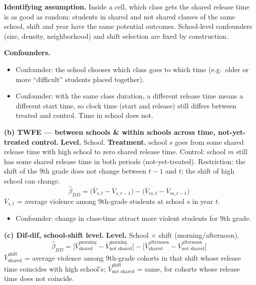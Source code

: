 \noindent\textbf{Identifying assumption.} Inside a cell, which class gets
the shared release time is as good as random: students in shared and not
shared classes of the same school, shift and year have the same potential
outcomes. School-level confounders (size, density, neighborhood) and shift
selection are fixed by construction.

\noindent\textbf{Confounders.} 
\begin{itemize}
\item Confounder: the school chooses which class goes to which time
(e.g.\ older or more ``difficult'' students placed together).
\item Confounder: with the same class duration, a different release time
means a different start time, so clock time (start and release) still
differs between treated and control. Time in school does not.
\end{itemize}


\noindent\textbf{(b) TWFE --- between schools \& within schools across
time, not-yet-treated control.}
\noindent\textbf{Level.} School.
 \noindent\textbf{Treatment.} school $s$ goes from some
shared release time with high school to zero shared release time.
Control: school $m$ still has some shared release time in both periods
(not-yet-treated).
Restriction: the shift of the 9th grade does not change between $t-1$
and $t$; the shift of high school can change.
\begin{equation}
  \hat\beta_{DD} = \big(\overline{V}_{s,t} - \overline{V}_{s,t-1}\big)
  - \big(\overline{V}_{m,t} - \overline{V}_{m,t-1}\big)
\end{equation}
$\overline{V}_{s,t}$ = average violence among 9th-grade students at school
$s$ in year $t$.

\begin{itemize}
\item Confounder:
 change in class-time attract more violent students for 9th grade.
\end{itemize}

\medskip
\noindent\textbf{(c) Dif-dif, school-shift level.}
\noindent\textbf{Level.} School $\times$ shift (morning/afternoon).
\begin{equation}
  \hat\beta_{DD} = \Big[\overline{V}^{\text{morning}}_{\text{shared}}
  - \overline{V}^{\text{morning}}_{\text{not shared}}\Big]
  - \Big[\overline{V}^{\text{afternoon}}_{\text{shared}}
  - \overline{V}^{\text{afternoon}}_{\text{not shared}}\Big]
\end{equation}
$\overline{V}^{\text{shift}}_{\text{shared}}$ = average violence among
9th-grade cohorts in that shift whose release time coincides with high
school's; $\overline{V}^{\text{shift}}_{\text{not shared}}$ = same, for
cohorts whose release time does not coincide.

